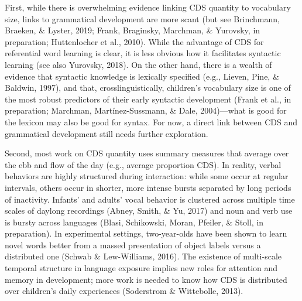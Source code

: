 \documentclass[floatsintext,man]{apa6}
\theoremstyle{definition}
\theoremstyle{definition}
\theoremstyle{definition}
\theoremstyle{remark}
\begin{document}
First, while there is overwhelming evidence linking CDS quantity to
vocabulary size, links to grammatical development are more scant (but
see Brinchmann, Braeken, \& Lyster, 2019; Frank, Braginsky, Marchman, \&
Yurovsky, in preparation; Huttenlocher et al., 2010). While the
advantage of CDS for referential word learning is clear, it is less
obvious how it facilitates syntactic learning (see also Yurovsky, 2018).
On the other hand, there is a wealth of evidence that syntactic
knowledge is lexically specified (e.g., Lieven, Pine, \& Baldwin, 1997),
and that, crosslinguistically, children's vocabulary size is one of the
most robust predictors of their early syntactic development (Frank et
al., in preparation; Marchman, Martínez-Sussmann, \& Dale, 2004)---what
is good for the lexicon may also be good for syntax. For now, a direct
link between CDS and grammatical development still needs further
exploration.

Second, most work on CDS quantity uses summary measures that average
over the ebb and flow of the day (e.g., average proportion CDS). In
reality, verbal behaviors are highly structured during interaction:
while some occur at regular intervals, others occur in shorter, more
intense bursts separated by long periods of inactivity. Infants' and
adults' vocal behavior is clustered across multiple time scales of
daylong recordings (Abney, Smith, \& Yu, 2017) and noun and verb use is
bursty across languages (Blasi, Schikowski, Moran, Pfeiler, \& Stoll, in
preparation). In experimental settings, two-year-olds have been shown to
learn novel words better from a massed presentation of object labels
versus a distributed one (Schwab \& Lew-Williams, 2016). The existence
of multi-scale temporal structure in language exposure implies new roles
for attention and memory in development; more work is needed to know how
CDS is distributed over children's daily experiences (Soderstrom \&
Wittebolle, 2013).
\end{document}
